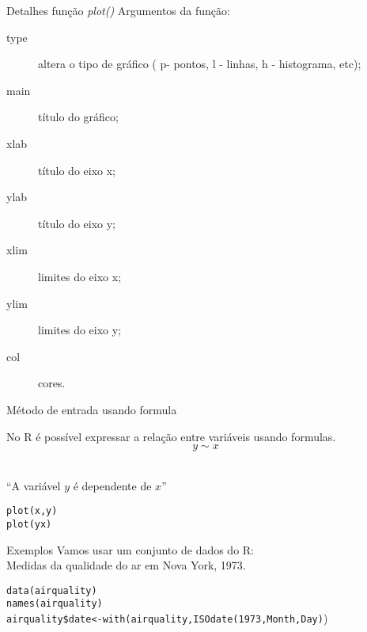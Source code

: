 \documentclass{beamer}
\begin{document}
\begin{frame}{Detalhes função \textit{plot()}}
Argumentos da função:

\begin{description}
\item[type] altera o tipo de gráfico ( p- pontos, l - linhas, h - histograma, etc);
\item[main] título do gráfico;
\item[xlab] título do eixo x;
\item[ylab] título do eixo y;
\item[xlim] limites do eixo x;
\item[ylim] limites do eixo y;
\item[col] cores.
\end{description}
  
\end{frame}


\begin{frame}{Método de entrada usando formula}

No R é possível expressar a relação entre variáveis usando formulas.\\
\[y \sim x\] \\ 
\begin{center}
  ``A variável $y$ é dependente de $x$''
\end{center}
\texttt{plot(x,y)\\
plot(y\texttildelow x)}  
\end{frame}

\begin{frame}{Exemplos}
Vamos usar um conjunto de dados do R:\\ Medidas da qualidade do ar em Nova York, 1973.

\texttt{data(airquality)\\
names(airquality)\\
airquality\$date<-with(airquality,ISOdate(1973,Month,Day)})

\begin{table}[!htbp] \centering 
{}
\end{table}
\end{frame}
\end{document}
